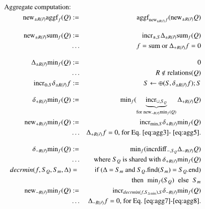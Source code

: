 \documentclass{article}
\begin{document}
%
%
%
\begin{figure*}
\begin{eqnarray}
\mbox{Aggregate computation:} && \nonumber
\\
\label{eq:agg1}
\algnew_{\pm R(\vec{r})} \algaggf_f(Q) &:=&
   \algaggf_{\algnew_{\pm R(\vec{r})} f}(\algnew_{\pm R(\vec{r})} Q)
%
%
\\[2ex]
\label{eq:agg2}
\algnew_{\pm R(\vec{r})} \algsum_{f}(Q) &:=&
\algincr_{\pm, S} \Delta_{\pm R(\vec{r})} \algsum_{f}(Q)
\\
\nonumber &\dots&
\mbox{$f = \algsum$ or $\Delta_{+R(\vec{r})} f = 0$}
%
%
\\[2ex]
\label{eq:agg3}
\Delta_{\pm R(\vec{r})} \algmin_f(Q) &:=& 0
\\
\nonumber &\dots& R \notin \mbox{relations($Q$)}
%
%
\\
\label{eq:agg4}
\algincr_{\oplus, S} \delta_{\pm R(\vec{r})} f &:=&
S \leftarrow \oplus(S, \delta_{\pm R(\vec{r})} f); S
%
%
\\[2ex]
\label{eq:agg5}
\delta_{+R(\vec{r})} \algmin_f(Q) &:=&
    \algmin_{f} (\underbrace{\algincr_{\cup, S_Q}}_{
    \mathrm{for} \; \algnew_{-R(\vec{r})} \algmin_f(Q)}
    \Delta_{+R(\vec{r})} Q)
\\
\label{eq:agg6}
\algnew_{+R(\vec{r})} \algmin_{f}(Q) &:=&
\algincr_{\min,S} \delta_{+R(\vec{r})} \algmin_{f}(Q)
\\
\nonumber
&\dots& \Delta_{+R(\vec{r})} f = 0
\mbox{, for Eq.~\ref{eq:agg3}-~\ref{eq:agg5}.}
%
%
\\[2ex]
\label{eq:agg7}
\delta_{-R(\vec{r})} \algmin_{f}(Q) &:=& \algmin_{f}(\algincrdiff_{-,S_Q} \Delta_{-R(\vec{r})} Q)
\\
\nonumber &\dots& \mbox{where $S_Q$ is shared with $\delta_{+R(\vec{r})} \algmin_f(Q)$}
\\
\label{eq:agg8}
decrmin(f, S_Q, S_m, \Delta) &=&
\mbox{if ($\Delta$ = $S_m$ and $S_Q$.find($S_m$) = $S_Q$.end)}\\
\nonumber && \mbox{then} \; \; \algmin_{f}(S_Q) \; \; \mbox{else} \; \; S_m
\\
\label{eq:agg9}
\algnew_{-R(\vec{r})} \algmin_{f}(Q) &:=&
\algincr_{decrmin(f, S_{\Delta \min}), S} \delta_{-R(\vec{r})} \algmin_{f}(Q)
\\
\nonumber &\dots& \Delta_{-R(\vec{r})} f = 0
\mbox{, for Eq.~\ref{eq:agg7}-\ref{eq:agg8}.}
\end{eqnarray}
\end{figure*}
\end{document}
